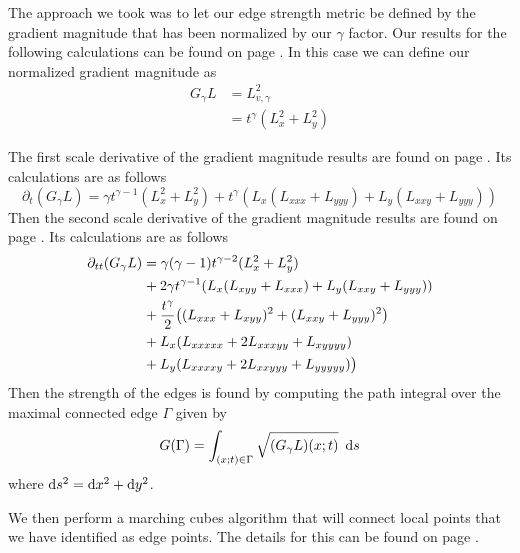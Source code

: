 \documentclass{article}
\begin{document}
The approach we took was to let our edge strength metric be defined by the gradient magnitude that has been normalized by our $\gamma$ factor. 
Our results for the following calculations can be found on page \pageref{t_gma}.
In this case we can define our normalized gradient magnitude as \cite{Lindeberg1998}
\begin{align}
  G_{\gamma}L &= L_{v,\gamma}^2 \\
  &= t^{\gamma}(L_x^2+L_y^2)
\end{align}

The first scale derivative of the gradient magnitude results are found on page \pageref{t_tgma}. 
Its calculations are as follows \cite{Lindeberg1998}
\begin{equation} \label{dtGl}
  \partial_t (G_{\gamma}L) = \gamma t^{\gamma-1}(L_x^2+L_y^2) + t^{\gamma}(L_x(L_{xxx}+L_{yyy})+L_y(L_{xxy} + L_{yyy}))
\end{equation}
Then the second scale derivative of the gradient magnitude results are found on page \pageref{t_ttgma}.
Its calculations are as follows \cite{Lindeberg1998}
\begin{equation}
  \begin{aligned}
    \partial_{tt}(G_{\gamma}L) &= \gamma(\gamma-1)t^{\gamma-2}(L_x^2+L_y^2) \\
     & \hspace{.5pt}+ 2\gamma t^{\gamma-1}(L_x(L_{xyy}+L_{xxx})+L_y(L_{xxy}+L_{yyy})) \\
     & \hspace{.5pt}+\frac{t^{\gamma}}{2}\big((L_{xxx}+L_{xyy})^2+(L_{xxy}+L_{yyy})^2\big) \\
     & \hspace{.5pt}+ L_x(L_{xxxxx}+2L_{xxxyy}+L_{xyyyy}) \\
     & \hspace{.5pt}+ L_y(L_{xxxxy}+2L_{xxyyy}+L_{yyyyy})\big)
  \end{aligned}
\end{equation}
Then the strength of the edges is found by computing the path integral over the maximal connected edge $\Gamma$ given by \cite{Lindeberg1998}
\begin{equation}
  G(\Gamma) = \int_{(x;t) \in \Gamma} \sqrt{(G_{\gamma}L)(x;t)} \,\, \operatorname{d \!} s
\end{equation}
where $\operatorname{d \!} s^2=\operatorname{d \!} x^2+\operatorname{d \!} y^2$.

We then perform a marching cubes algorithm that will connect local points that we have identified as edge points. The details for this can be found on page \pageref{mcube}.
\end{document}
